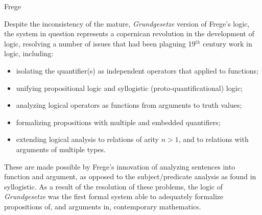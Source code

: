 \begin{entry}{Frege}
\begin{history}
Despite the inconsistency of the mature, \emph{Grundgesetze} version of Frege's logic, the system in question represents a copernican revolution in the development of logic, resolving a number of issues that had been plaguing 19$^{th}$ century work in logic, including:
\begin{itemize}
\item isolating the quantifier(s) as independent operators that applied to functions;
\item unifying propositional logic and syllogistic (proto-quantificational) logic;
\item analyzing logical operators as functions from arguments to truth values;
\item formalizing propositions with multiple and embedded quantifiers;
\item extending logical analysis to relations of arity $n > 1$, and to relations with arguments of multiple types.
\end{itemize}
These are made possible by Frege's innovation of analyzing sentences into function and argument, as opposed to the subject/predicate analysis as found in syllogistic. As a result of the resolution of these problems, the logic of \emph{Grundgesetze} was the first formal system able to adequately formalize propositions of, and arguments in, contemporary mathematics.
\end{history}

\end{entry}









